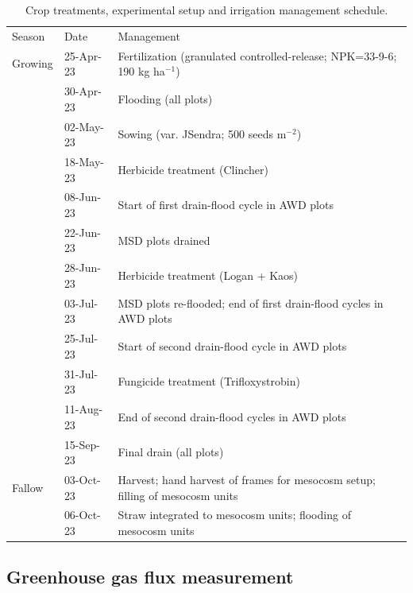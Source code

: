 \begin{table} [htbp]
    \centering
    \footnotesize  
    \begin{tabular}{ l  l  l }
\cline{1-3}
{Season} & {Date} & {Management} \\
\cline{1-3}
\rule{0pt}{3ex} %
{Growing} & {25-Apr-23} & {Fertilization (granulated controlled-release; NPK=33-9-6; 190 kg ha$^{-1}$)} \\
{} & {30-Apr-23} & {Flooding (all plots)} \\
{} & {02-May-23} & {Sowing (var. JSendra; 500 seeds m$^{-2}$)} \\
{} & {18-May-23} & {Herbicide treatment (Clincher)} \\
{} & {08-Jun-23} & {Start of first drain-flood cycle in  AWD plots} \\
{} & {22-Jun-23} & {MSD plots drained} \\
{} & {28-Jun-23} & {Herbicide treatment (Logan + Kaos)} \\
{} & {03-Jul-23} & {MSD plots re-flooded; end of first drain-flood cycles in  AWD plots} \\
{} & {25-Jul-23} & {Start of second drain-flood cycle in  AWD plots} \\
{} & {31-Jul-23} & {Fungicide treatment (Trifloxystrobin)} \\
{} & {11-Aug-23} & {End of second drain-flood cycles in  AWD plots} \\
{} & {15-Sep-23} & {Final drain (all plots)} \\
\rule{0pt}{3ex}
{Fallow} & {03-Oct-23} & {Harvest; hand harvest of frames for mesocosm setup; filling of mesocosm units} \\
{} & {06-Oct-23} & {Straw integrated to mesocosm units; flooding of mesocosm units}\\
\cline{1-3}
    \end{tabular}
    \caption{Crop treatments, experimental setup and irrigation management schedule.}
    \label{field_mgmt}
\end{table} 

\subsection{Greenhouse gas flux measurement}
\label{sec:meth_GHG} 

